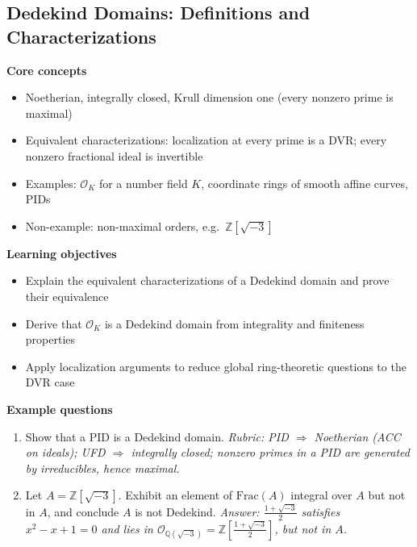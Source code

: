 \documentclass[11pt]{article}
\newcommand{\Q}{\mathbb{Q}}
\newcommand{\Z}{\mathbb{Z}}
\newcommand{\OK}{\mathcal{O}_K}
\begin{document}
\subsection{Dedekind Domains: Definitions and Characterizations}
\textbf{Core concepts}
\begin{itemize}[noitemsep]
  \item Noetherian, integrally closed, Krull dimension one (every nonzero prime is maximal)
  \item Equivalent characterizations: localization at every prime is a DVR; every nonzero fractional ideal is invertible
  \item Examples: $\OK$ for a number field $K$, coordinate rings of smooth affine curves, PIDs
  \item Non-example: non-maximal orders, e.g.\ $\Z[\sqrt{-3}]$
\end{itemize}
\textbf{Learning objectives}
\begin{itemize}[noitemsep]
  \item Explain the equivalent characterizations of a Dedekind domain and prove their equivalence
  \item Derive that $\OK$ is a Dedekind domain from integrality and finiteness properties
  \item Apply localization arguments to reduce global ring-theoretic questions to the DVR case
\end{itemize}
\textbf{Example questions}
\begin{enumerate}[noitemsep]
  \item[Q1 (foundational).] Show that a PID is a Dedekind domain. \emph{Rubric: PID $\Rightarrow$ Noetherian (ACC on ideals); UFD $\Rightarrow$ integrally closed; nonzero primes in a PID are generated by irreducibles, hence maximal.}
  \item[Q2 (advanced).] Let $A = \Z[\sqrt{-3}]$. Exhibit an element of $\mathrm{Frac}(A)$ integral over $A$ but not in $A$, and conclude $A$ is not Dedekind. \emph{Answer: $\tfrac{1+\sqrt{-3}}{2}$ satisfies $x^2-x+1=0$ and lies in $\mathcal{O}_{\Q(\sqrt{-3})}=\Z[\tfrac{1+\sqrt{-3}}{2}]$, but not in $A$.}
\end{enumerate}

\end{document}
